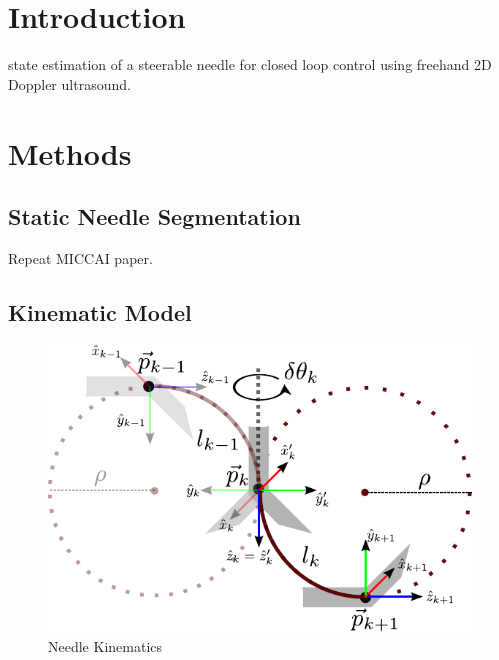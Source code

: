 \documentclass[journal,transmag]{IEEEtran}
\begin{document}
\IEEEdisplaynontitleabstractindextext




%
\IEEEpeerreviewmaketitle



\section{Introduction}
 state estimation of a steerable needle for closed loop control using freehand 2D Doppler ultrasound.

\section{Methods}
\subsection{Static Needle Segmentation}
Repeat MICCAI paper.

\subsection{Kinematic Model}
\begin{figure}[!t]
\centering
\includegraphics[scale=0.9]{Figures/NeedleKinematics.pdf}
\caption{Needle Kinematics}
\label{fig_nk}
\end{figure}
\end{document}
